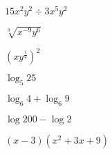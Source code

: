 \item $15x^{2}y^2 \div 3x^5 y^{2}$
\item $\sqrt[3]{x^{-9} y^{6}}$
\item $\displaystyle \left( x y^{\frac{1}{4}}\right)^2$
\item $\log_5 25$
\item $\log_6 4 + \log_6 9$
\item $\log 200 - \log 2$
\item $(x-3)(x^2+3x+9)$
